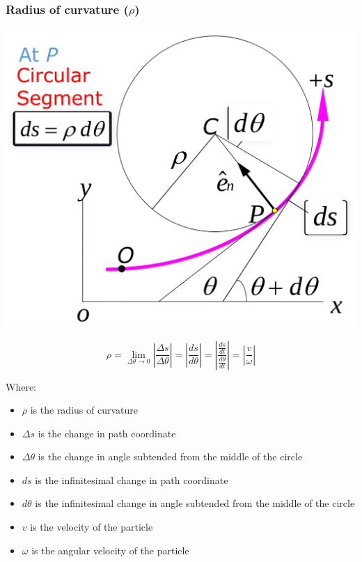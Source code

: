 \documentclass[11pt]{article}
\begin{document}
\subsubsection{Radius of curvature (\(\rho\))}
\label{sec:orgfa18822}
\begin{center}
\includegraphics[width=.9\linewidth]{./images/radius-of-curvature-in-path-coordinate-system.png}
\end{center}
\[\rho = \lim_{\Delta \theta \rightarrow 0} \left|\frac{\Delta s}{\Delta \theta} \right| = \left| \frac{ds}{d \theta} \right| = \left| \frac{\frac{ds}{dt}}{\frac{d \theta}{dt}} \right| = \left| \frac{v}{\omega} \right|\]

Where:
\begin{itemize}
\item \(\rho\) is the radius of curvature
\item \(\Delta s\) is the change in path coordinate
\item \(\Delta \theta\) is the change in angle subtended from the middle of the circle
\item \(ds\) is the infinitesimal change in path coordinate
\item \(d \theta\) is the infinitesimal change in angle subtended from the middle of the circle
\item \(v\) is the velocity of the particle
\item \(\omega\) is the angular velocity of the particle
\end{itemize}
\end{document}
